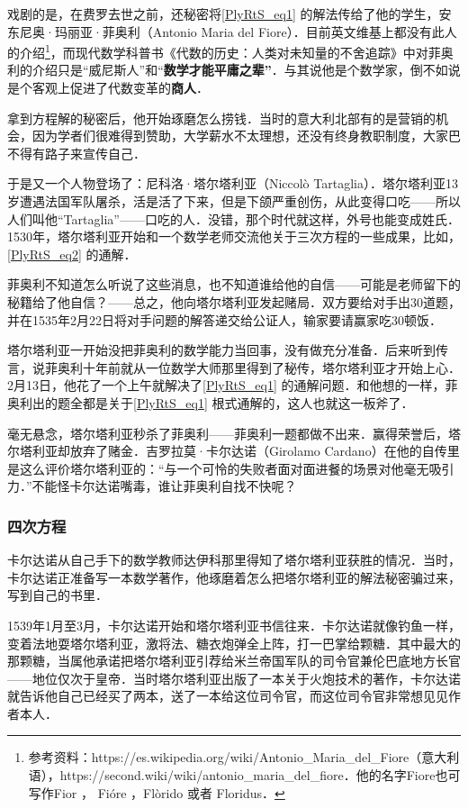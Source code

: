 戏剧的是，在费罗去世之前，还秘密将\autoref{PlyRtS_eq1} 的解法传给了他的学生，安东尼奥·玛丽亚·菲奥利（Antonio Maria del Fiore）．目前英文维基上都没有此人的介绍\footnote{参考资料：https://es.wikipedia.org/wiki/Antonio_Maria_del_Fiore（意大利语），https://second.wiki/wiki/antonio_maria_del_fiore．他的名字Fiore也可写作Fior ， Fióre ，Flòrido 或者 Floridus．}，而现代数学科普书《代数的历史：人类对未知量的不舍追踪》中对菲奥利的介绍只是“威尼斯人”和“\textbf{数学才能平庸之辈”}．与其说他是个数学家，倒不如说是个客观上促进了代数变革的\textbf{商人}．

拿到方程解的秘密后，他开始琢磨怎么捞钱．当时的意大利北部有的是营销的机会，因为学者们很难得到赞助，大学薪水不太理想，还没有终身教职制度，大家巴不得有路子来宣传自己．

于是又一个人物登场了：尼科洛·塔尔塔利亚（Niccolò Tartaglia）．塔尔塔利亚13岁遭遇法国军队屠杀，活是活了下来，但是下颌严重创伤，从此变得口吃——所以人们叫他“Tartaglia”——口吃的人．没错，那个时代就这样，外号也能变成姓氏．1530年，塔尔塔利亚开始和一个数学老师交流他关于三次方程的一些成果，比如，\autoref{PlyRtS_eq2} 的通解．

菲奥利不知道怎么听说了这些消息，也不知道谁给他的自信——可能是老师留下的秘籍给了他自信？——总之，他向塔尔塔利亚发起赌局．双方要给对手出30道题，并在1535年2月22日将对手问题的解答递交给公证人，输家要请赢家吃30顿饭．

塔尔塔利亚一开始没把菲奥利的数学能力当回事，没有做充分准备．后来听到传言，说菲奥利十年前就从一位数学大师那里得到了秘传，塔尔塔利亚才开始上心．2月13日，他花了一个上午就解决了\autoref{PlyRtS_eq1} 的通解问题．和他想的一样，菲奥利出的题全都是关于\autoref{PlyRtS_eq1} 根式通解的，这人也就这一板斧了．

毫无悬念，塔尔塔利亚秒杀了菲奥利——菲奥利一题都做不出来．赢得荣誉后，塔尔塔利亚却放弃了赌金．吉罗拉莫·卡尔达诺（Girolamo Cardano）在他的自传里是这么评价塔尔塔利亚的：“与一个可怜的失败者面对面进餐的场景对他毫无吸引力．”不能怪卡尔达诺嘴毒，谁让菲奥利自找不快呢？

\subsubsection{四次方程}

卡尔达诺从自己手下的数学教师达伊科那里得知了塔尔塔利亚获胜的情况．当时，卡尔达诺正准备写一本数学著作，他琢磨着怎么把塔尔塔利亚的解法秘密骗过来，写到自己的书里．

1539年1月至3月，卡尔达诺开始和塔尔塔利亚书信往来．卡尔达诺就像钓鱼一样，变着法地耍塔尔塔利亚，激将法、糖衣炮弹全上阵，打一巴掌给颗糖．其中最大的那颗糖，当属他承诺把塔尔塔利亚引荐给米兰帝国军队的司令官兼伦巴底地方长官——地位仅次于皇帝．当时塔尔塔利亚出版了一本关于火炮技术的著作，卡尔达诺就告诉他自己已经买了两本，送了一本给这位司令官，而这位司令官非常想见见作者本人．

